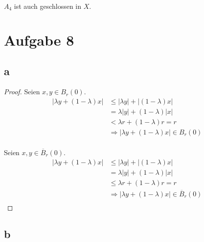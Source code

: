 \documentclass[10pt,a4paper]{article}
\begin{document}
$A_{4}$ ist auch geschlossen in $X$.

\section*{Aufgabe 8}

\subsection*{a}

\begin{proof}
Seien $x, y \in B_{r}(0)$.
\begin{align}
|\lambda y + (1 - \lambda)x| & \le |\lambda y| + |(1 - \lambda) x|\\
& = \lambda |y| + (1 - \lambda) |x|\\
& < \lambda r + (1 - \lambda) r = r\\
& \Rightarrow |\lambda y + (1 - \lambda)x| \in B_{r}(0)\\
\end{align}

Seien $x, y \in \overline{B}_{r}(0)$.
\begin{align}
|\lambda y + (1 - \lambda)x| & \le |\lambda y| + |(1 - \lambda) x|\\
& = \lambda |y| + (1 - \lambda) |x|\\
& \le \lambda r + (1 - \lambda) r = r\\
& \Rightarrow |\lambda y + (1 - \lambda)x| \in \overline{B}_{r}(0)\\
\end{align}
\end{proof}

\subsection*{b}
\end{document}
